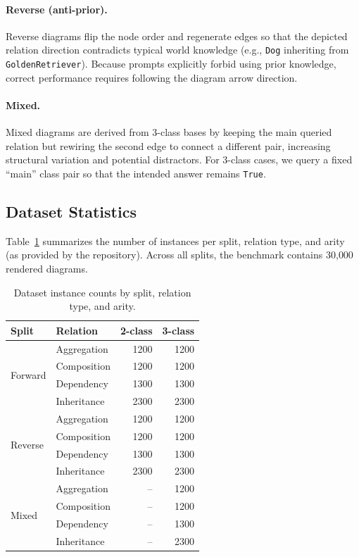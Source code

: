 \documentclass[11pt]{article}
\begin{document}
\paragraph{Reverse (anti-prior).}
Reverse diagrams flip the node order and regenerate edges so that the depicted relation direction contradicts typical world knowledge (e.g., \texttt{Dog} inheriting from \texttt{GoldenRetriever}).
Because prompts explicitly forbid using prior knowledge, correct performance requires following the diagram arrow direction.

\paragraph{Mixed.}
Mixed diagrams are derived from 3-class bases by keeping the main queried relation but rewiring the second edge to connect a different pair, increasing structural variation and potential distractors.
For 3-class cases, we query a fixed ``main'' class pair so that the intended answer remains \texttt{True}.

\subsection{Dataset Statistics}
\label{sec:stats}
Table~\ref{tab:data} summarizes the number of instances per split, relation type, and arity (as provided by the repository).
Across all splits, the benchmark contains 30{,}000 rendered diagrams.

\begin{table}[t]
\centering
\small
\begin{tabular}{llrr}
\toprule
\textbf{Split} & \textbf{Relation} & \textbf{2-class} & \textbf{3-class} \\
\midrule
\multirow{4}{*}{Forward} & Aggregation & 1200 & 1200 \\
& Composition & 1200 & 1200 \\
& Dependency & 1300 & 1300 \\
& Inheritance & 2300 & 2300 \\
\midrule
\multirow{4}{*}{Reverse} & Aggregation & 1200 & 1200 \\
& Composition & 1200 & 1200 \\
& Dependency & 1300 & 1300 \\
& Inheritance & 2300 & 2300 \\
\midrule
\multirow{4}{*}{Mixed} & Aggregation & -- & 1200 \\
& Composition & -- & 1200 \\
& Dependency & -- & 1300 \\
& Inheritance & -- & 2300 \\
\bottomrule
\end{tabular}
\caption{Dataset instance counts by split, relation type, and arity.}
\label{tab:data}
\end{table}
\end{document}
